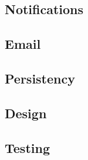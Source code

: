 \subsection{Notifications}

\subsection{Email}

\subsection{Persistency}

\subsection{Design}

\subsection{Testing}

